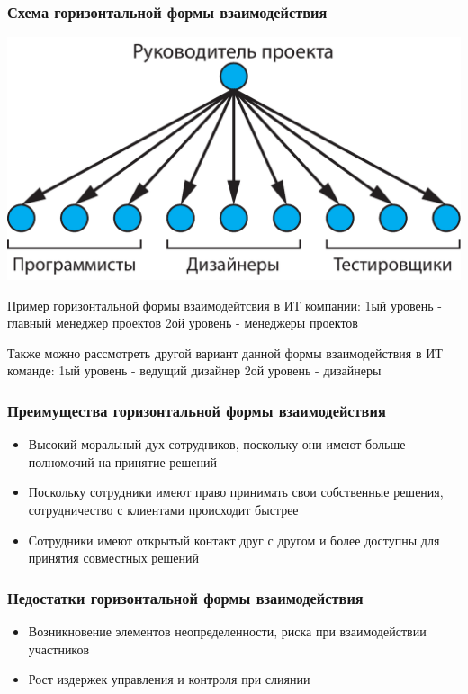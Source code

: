 \documentclass{../industrial-development}
\begin{document}
\begin{frame} \frametitle{Схема горизонтальной формы взаимодействия}
  \begin{block}{}
\centerline{\includegraphics[width=1\textwidth]{horizontal.pdf}}
  \end{block}
\end{frame}

\lecturenotes
Пример горизонтальной формы взаимодейтсвия в ИТ компании:
1ый уровень - главный менеджер проектов
2ой уровень - менеджеры проектов

Также можно рассмотреть другой вариант данной формы взаимодействия в ИТ команде:
1ый уровень -  ведущий дизайнер
2ой уровень - дизайнеры

\begin{frame} \frametitle{Преимущества горизонтальной формы взаимодействия}
  
  \begin{itemize}
  \item Высокий моральный дух сотрудников, поскольку они имеют больше полномочий на принятие решений
  \item Поскольку сотрудники  имеют право принимать свои собственные решения, сотрудничество с клиентами происходит быстрее
  \item Сотрудники имеют открытый контакт друг с другом и более доступны для принятия совместных решений
  \end{itemize}
\end{frame}

\begin{frame} \frametitle{Недостатки горизонтальной формы взаимодействия}
	
	\begin{itemize}
		\item Возникновение элементов неопределенности, риска при взаимодействии участников
		\item Рост издержек управления и контроля при слиянии
	\end{itemize}
\end{frame}
\end{document}
